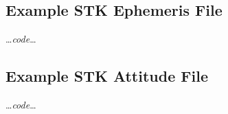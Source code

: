 \subsection{Example STK Ephemeris File}\label{app:efile}
    \dots\textit{code}\dots

\subsection{Example STK Attitude File}\label{app:afile}
    \dots\textit{code}\dots